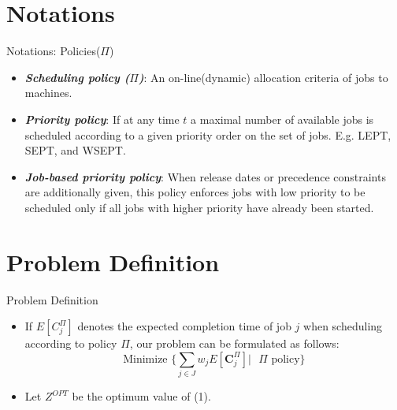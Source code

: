 \documentclass{beamer}
\begin{document}
\section{Notations}
\begin{frame}{Notations: Policies($\Pi$)}
    \begin{itemize}
        \justifying
        \item \textbf{\textit{Scheduling policy ($\Pi$)}}: An on-line(dynamic) allocation criteria of jobs to machines.
        \vspace{0.6cm}
        \item \textbf{\textit{Priority policy}}: If at any time $t$ a maximal number of available jobs is scheduled according to a given priority order on the set of jobs. E.g. LEPT, SEPT, and WSEPT.
        \vspace{0.6cm}
        \item \textbf{\textit{Job-based priority policy}}: When release dates or precedence constraints are additionally given, this policy enforces jobs with low priority to be scheduled only if all jobs with higher priority have already been started. 
    \end{itemize}
\end{frame}


\section{Problem Definition}
\begin{frame}{Problem Definition}
    \begin{itemize}
        \justifying
        \item If $E[C_j^\Pi]$ denotes the expected completion time of job $j$ when scheduling according to policy $\Pi$, our problem can be formulated as follows:
        \vspace{0.8cm}
        \begin{equation}
        \text{Minimize } \bigg\{\sum\limits_{j\in J} w_j E[\pmb{C}_j^\Pi] \bigg\vert \text{ } \Pi \text{ policy} \bigg\}    \end{equation}
        \vspace{0.8cm}
        \item Let $Z^{OPT}$ be the optimum value of (1).
    \end{itemize}
\end{frame}
\end{document}
